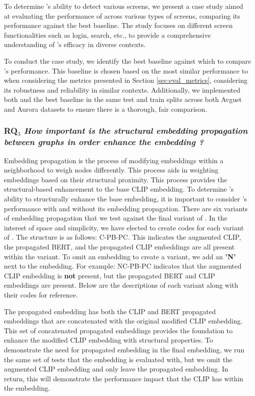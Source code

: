 To determine \FRAME's ability to detect various screens, we present a case study aimed at evaluating the performance of \FRAME across various types of screens, comparing its performance against the best baseline. The study focuses on different screen functionalities such as login, search, etc., to provide a comprehensive understanding of \FRAME's efficacy in diverse contexts. 

To conduct the case study, we identify the best baseline against which to compare \FRAME's performance. This baseline is chosen based on the most similar performance to \FRAME when considering the metrics presented in Section \ref{sec:eval_metrics}, considering its robustness and reliability in similar contexts. Additionally, we implemented both \FRAME and the best baseline in the same test and train splits across both Avgust and Aurora datasets to ensure there is a thorough, fair comparison.

\subsubsection{\textbf{RQ$_3$} \textit{How important is the structural embedding propagation between graphs in order enhance the embedding ?}}

Embedding propagation is the process of modifying embeddings within a neighborhood to weigh nodes differently. This process aids in weighting embeddings based on their structural proximity. This process provides the structural-based enhancement to the base CLIP embedding. To determine \FRAME's ability to structurally enhance the base embedding, it is important to consider \FRAME's performance with and without its embedding propagation. There are six variants of embedding propagation that we test against the final variant of \FRAME. In the interest of space and simplicity, we have elected to create codes for each variant of \FRAME. The structure is as follows: C-PB-PC. This indicates the augmented CLIP, the propagated BERT, and the propagated CLIP embeddings are all present within the variant. To omit an embedding to create a variant, we add an \textbf{'N'} next to the embedding. For example: NC-PB-PC indicates that the augmented CLIP embedding is \textbf{not} present, but the propagated BERT and CLIP embeddings are present. Below are the descriptions of each variant along with their codes for reference. 


The propagated embedding has both the CLIP and BERT propagated embeddings that are concatenated with the original modified CLIP embedding. This set of concatenated propagated embeddings provides the foundation to enhance the modified CLIP embedding with structural properties. To demonstrate the need for propagated embedding in the final embedding, we run the same set of tests that the \FRAME embedding is evaluated with, but we omit the augmented CLIP embedding and only leave the propagated embedding. In return, this will demonstrate the performance impact that the CLIP has within the \FRAME embedding.

